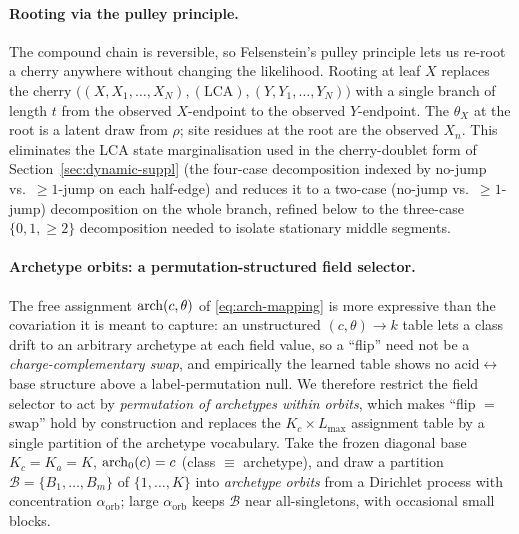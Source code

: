 \paragraph{Rooting via the pulley principle.}
The compound chain is reversible, so Felsenstein's pulley principle
lets us re-root a cherry anywhere without changing the likelihood.
Rooting at leaf $X$ replaces the cherry $\big((X, X_1,\dots,X_N),
(\text{LCA}), (Y, Y_1,\dots,Y_N)\big)$ with a single branch of length
$t$ from the observed $X$-endpoint to the observed $Y$-endpoint.
The $\theta_X$ at the root is a latent draw from $\rho$; site
residues at the root are the observed $X_n$. This eliminates the LCA
state marginalisation used in the cherry-doublet form of
Section~\ref{sec:dynamic-suppl} (the four-case decomposition indexed
by no-jump vs.\ ${\geq}1$-jump on each half-edge) and reduces it to a
two-case (no-jump vs.\ ${\geq}1$-jump) decomposition on the whole
branch, refined below to the three-case $\{0, 1, {\geq}2\}$
decomposition needed to isolate stationary middle segments.

\paragraph{Archetype orbits: a permutation-structured field selector.}
\label{par:archetype-orbits}
The free assignment $\mathrm{arch}(c,\theta)$ of \eqref{eq:arch-mapping} is more
expressive than the covariation it is meant to capture: an unstructured
$(c,\theta)\!\to\!k$ table lets a class drift to an arbitrary archetype at
each field value, so a ``flip'' need not be a \emph{charge-complementary
swap}, and empirically the learned table shows no acid$\leftrightarrow$base
structure above a label-permutation null. We therefore restrict the field
selector to act by \emph{permutation of archetypes within orbits}, which
makes ``flip $=$ swap'' hold by construction and replaces the
$K_c\times L_{\max}$ assignment table by a single partition of the archetype
vocabulary. Take the frozen diagonal base $K_c=K_a=K$, $\mathrm{arch}_0(c)=c$
(class $\equiv$ archetype), and draw a partition
$\mathcal{B}=\{B_1,\dots,B_m\}$ of $\{1,\dots,K\}$ into \emph{archetype
orbits} from a Dirichlet process with concentration $\alpha_{\mathrm{orb}}$;
large $\alpha_{\mathrm{orb}}$ keeps $\mathcal{B}$ near all-singletons, with
occasional small blocks.

